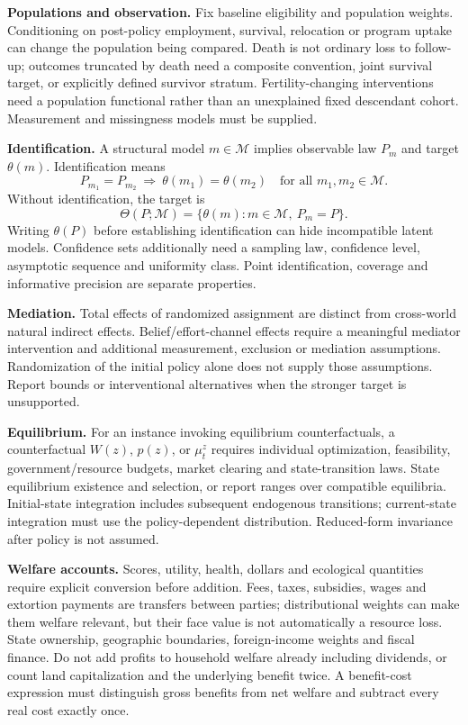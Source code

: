\documentclass[11pt,a4paper]{article}
\begin{document}
\textbf{Populations and observation.} Fix baseline eligibility and population weights. Conditioning on post-policy employment, survival, relocation or program uptake can change the population being compared. Death is not ordinary loss to follow-up; outcomes truncated by death need a composite convention, joint survival target, or explicitly defined survivor stratum. Fertility-changing interventions need a population functional rather than an unexplained fixed descendant cohort. Measurement and missingness models must be supplied.

\textbf{Identification.} A structural model \(m\in\mathcal M\) implies observable law \(P_m\) and target \(\theta(m)\). Identification means
\[
 P_{m_1}=P_{m_2}\ \Longrightarrow\ \theta(m_1)=\theta(m_2)
 \quad\text{for all }m_1,m_2\in\mathcal M .
\]
Without identification, the target is
\[
 \Theta(P;\mathcal M)=\{\theta(m):m\in\mathcal M,\ P_m=P\}.
\]
Writing \(\theta(P)\) before establishing identification can hide incompatible latent models. Confidence sets additionally need a sampling law, confidence level, asymptotic sequence and uniformity class. Point identification, coverage and informative precision are separate properties.

\textbf{Mediation.} Total effects of randomized assignment are distinct from cross-world natural indirect effects. Belief/effort-channel effects require a meaningful mediator intervention and additional measurement, exclusion or mediation assumptions. Randomization of the initial policy alone does not supply those assumptions. Report bounds or interventional alternatives when the stronger target is unsupported.

\textbf{Equilibrium.} For an instance invoking equilibrium counterfactuals, a counterfactual \(W(z)\), \(p(z)\), or \(\mu_t^z\) requires individual optimization, feasibility, government/resource budgets, market clearing and state-transition laws. State equilibrium existence and selection, or report ranges over compatible equilibria. Initial-state integration includes subsequent endogenous transitions; current-state integration must use the policy-dependent distribution. Reduced-form invariance after policy is not assumed.

\textbf{Welfare accounts.} Scores, utility, health, dollars and ecological quantities require explicit conversion before addition. Fees, taxes, subsidies, wages and extortion payments are transfers between parties; distributional weights can make them welfare relevant, but their face value is not automatically a resource loss. State ownership, geographic boundaries, foreign-income weights and fiscal finance. Do not add profits to household welfare already including dividends, or count land capitalization and the underlying benefit twice. A benefit-cost expression must distinguish gross benefits from net welfare and subtract every real cost exactly once.
\end{document}
